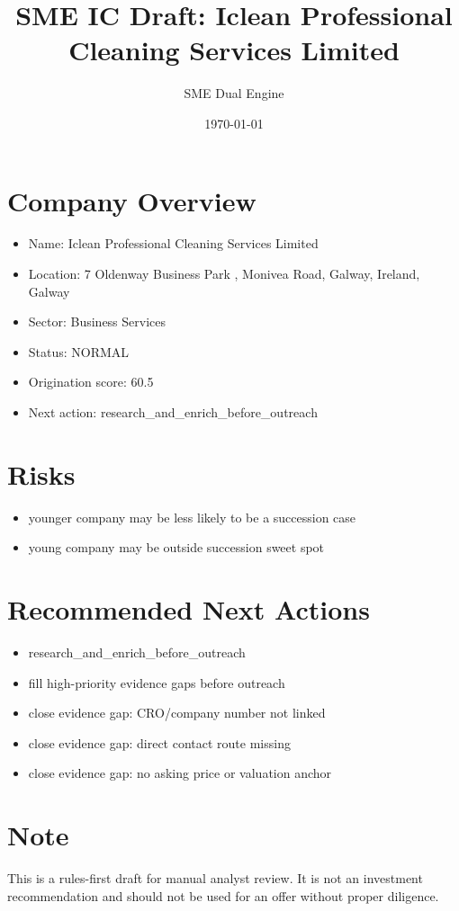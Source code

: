 \documentclass[11pt,a4paper]{article}
\title{SME IC Draft: Iclean Professional Cleaning Services Limited}
\author{SME Dual Engine}
\date{\today}
\begin{document}
\maketitle
\section*{Company Overview}
\begin{itemize}[leftmargin=1.4em]
\item Name: Iclean Professional Cleaning Services Limited
\item Location: 7 Oldenway Business Park , Monivea Road, Galway, Ireland, Galway
\item Sector: Business Services
\item Status: NORMAL
\item Origination score: 60.5
\item Next action: research\_and\_enrich\_before\_outreach
\end{itemize}
\section*{Risks}
\begin{itemize}[leftmargin=1.4em]
\item younger company may be less likely to be a succession case
\item young company may be outside succession sweet spot
\end{itemize}
\section*{Recommended Next Actions}
\begin{itemize}[leftmargin=1.4em]
\item research\_and\_enrich\_before\_outreach
\item fill high-priority evidence gaps before outreach
\item close evidence gap: CRO/company number not linked
\item close evidence gap: direct contact route missing
\item close evidence gap: no asking price or valuation anchor
\end{itemize}
\section*{Note}
This is a rules-first draft for manual analyst review. It is not an investment
recommendation and should not be used for an offer without proper diligence.
\end{document}
